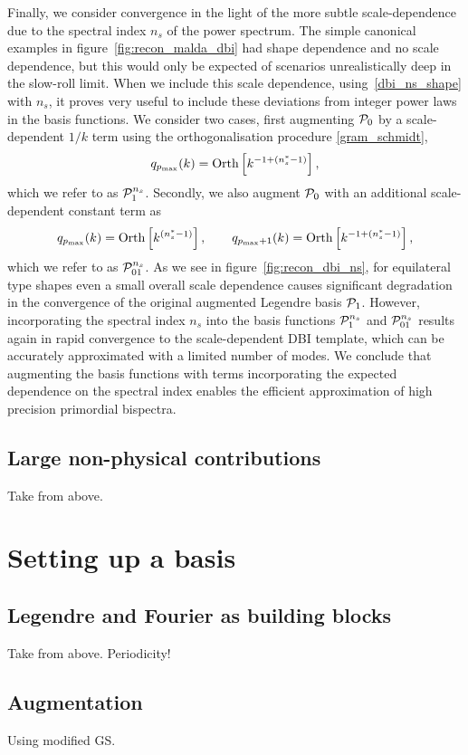 Finally, we consider convergence in the light of the more subtle scale-dependence due to the spectral index $n_s$ of the power spectrum.  The simple canonical examples in figure~\ref{fig:recon_malda_dbi} had shape dependence and no scale dependence, but this would only be expected of scenarios unrealistically deep in the slow-roll limit.
When we include this scale dependence, using~\eqref{dbi_ns_shape} with $n_s$, 
it proves very useful to include these deviations from
integer power laws in the basis functions.  We consider two cases, first augmenting $\mathcal{P}_0$ by a scale-dependent $1/k$ term using the orthogonalisation procedure \eqref{gram_schmidt}, 
\begin{align}\label{Lns_inv}
    q_{p_\text{max}}(k) = \text{Orth}\left[{k^{-1+(n_s^{*}-1)}}\right],
\end{align}
which we refer to as $\mathcal{P}^{n_s}_1$.
Secondly, we also augment $\mathcal{P}_0$ with an additional scale-dependent constant term as 
\begin{align}\label{Lns_both}
    q_{p_\text{max}}(k) = \text{Orth}\left[{k^{(n_s^{*}-1)}}\right],\qquad  q_{p_\text{max}\text{$+$}1}(k) = \text{Orth}\left[{k^{-1+(n_s^{*}-1)}}\right],
\end{align}
which we refer to as $\mathcal{P}^{n_s}_{01}$.
As we see in figure~\ref{fig:recon_dbi_ns}, for equilateral type shapes
even a small overall scale dependence causes significant degradation in the convergence of the original augmented Legendre basis $\mathcal{P}_1$.  However, incorporating the spectral index $n_s$  into the basis functions $\mathcal{P}^{n_s}_1$ and $\mathcal{P}^{n_s}_{01}$ results again in rapid convergence to the scale-dependent DBI template, which can be accurately approximated with a limited number of modes.    We conclude that augmenting the basis functions with terms incorporating the expected dependence on the spectral index enables the efficient approximation of high precision primordial bispectra. 
    \subsection{Large non-physical contributions}
    Take from above.
\section{Setting up a basis}
    \subsection{Legendre and Fourier as building blocks}
    Take from above. Periodicity!
    \subsection{Augmentation}
    Using modified GS.
